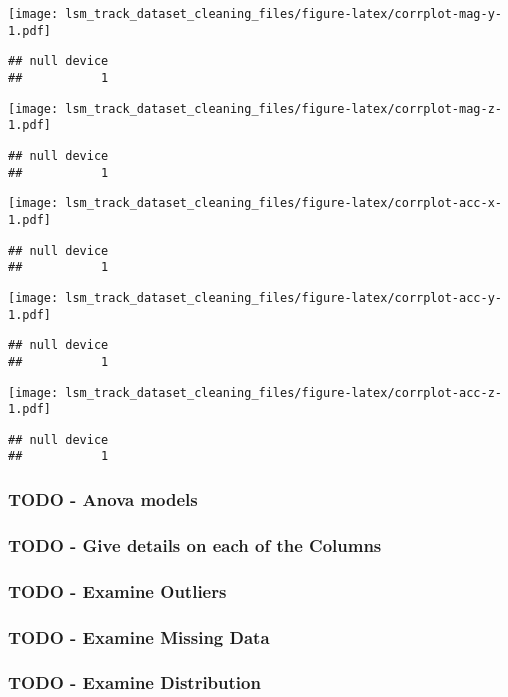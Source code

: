 \documentclass[]{article}
\begin{document}
\texttt{[image: lsm\_track\_dataset\_cleaning\_files/figure-latex/corrplot-mag-y-1.pdf]}

\begin{verbatim}
## null device 
##           1
\end{verbatim}

\texttt{[image: lsm\_track\_dataset\_cleaning\_files/figure-latex/corrplot-mag-z-1.pdf]}

\begin{verbatim}
## null device 
##           1
\end{verbatim}

\texttt{[image: lsm\_track\_dataset\_cleaning\_files/figure-latex/corrplot-acc-x-1.pdf]}

\begin{verbatim}
## null device 
##           1
\end{verbatim}

\texttt{[image: lsm\_track\_dataset\_cleaning\_files/figure-latex/corrplot-acc-y-1.pdf]}

\begin{verbatim}
## null device 
##           1
\end{verbatim}

\texttt{[image: lsm\_track\_dataset\_cleaning\_files/figure-latex/corrplot-acc-z-1.pdf]}

\begin{verbatim}
## null device 
##           1
\end{verbatim}

\hypertarget{todo---anova-models}{%
\subsubsection{TODO - Anova models}\label{todo---anova-models}}

\hypertarget{todo---give-details-on-each-of-the-columns}{%
\subsubsection{TODO - Give details on each of the
Columns}\label{todo---give-details-on-each-of-the-columns}}

\hypertarget{todo---examine-outliers}{%
\subsubsection{TODO - Examine Outliers}\label{todo---examine-outliers}}

\hypertarget{todo---examine-missing-data}{%
\subsubsection{TODO - Examine Missing
Data}\label{todo---examine-missing-data}}

\hypertarget{todo---examine-distribution}{%
\subsubsection{TODO - Examine
Distribution}\label{todo---examine-distribution}}
\end{document}
